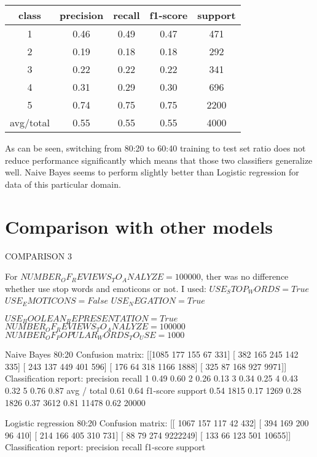\documentclass[12pt]{report}
\begin{document}
\begin{center}
	\begin{tabular}{c | c | c | c | c }
		\hline
		class & precision & recall & f1-score & support \\ \hline
		1 & 0.46 & 0.49 & 0.47 & 471 \\ \hline
		2 & 0.19 & 0.18 & 0.18 & 292 \\ \hline
		3 & 0.22 & 0.22 & 0.22 & 341 \\ \hline
		4 & 0.31 & 0.29 & 0.30 & 696 \\ \hline
		5 & 0.74 & 0.75 & 0.75 & 2200 \\ \hline
		avg/total & 0.55 & 0.55 & 0.55 & 4000 \\ \hline
	\end{tabular}
\end{center}


As can be seen, switching from 80:20 to 60:40 training to test set ratio does not reduce performance significantly which means that those two classifiers generalize well. Naive Bayes seems to perform slightly better than Logistic regression for data of this particular domain.

\newpage

\section{Comparison with other models}

COMPARISON 3

For $NUMBER_OF_REVIEWS_TO_ANALYZE = 100000$, ther was no difference whether use stop words and emoticons or not. I used:
$USE_STOP_WORDS = True$
$USE_EMOTICONS = False$
$USE_NEGATION = True$

$USE_BOOLEAN_REPRESENTATION = True$
$NUMBER_OF_REVIEWS_TO_ANALYZE = 100000$
$NUMBER_OF_POPULAR_WORDS_TO_USE = 1000$



Naive Bayes 80:20
Confusion matrix:
[[1085  177  155   67  331]
[ 382  165  245  142  335]
[ 243  137  449  401  596]
[ 176   64  318 1166 1888]
[ 325   87  168  927 9971]]
Classification report:
precision    recall
1 0.49 0.60
2 0.26 0.13
3 0.34 0.25
4 0.43 0.32
5 0.76 0.87
avg / total       0.61      0.64
f1-score   support
0.54      1815
0.17      1269
0.28      1826
0.37      3612
0.81     11478
0.62 20000

Logistic regression 80:20
Confusion matrix:
[[ 1067   157   117   42   432]
[  394   169   200   96   410]
[  214   166   405   310  731]
[  88   79   274  9222249]
[ 133   66   123  501 10655]]
Classification report:
precision    recall  f1-score   support
\end{document}
